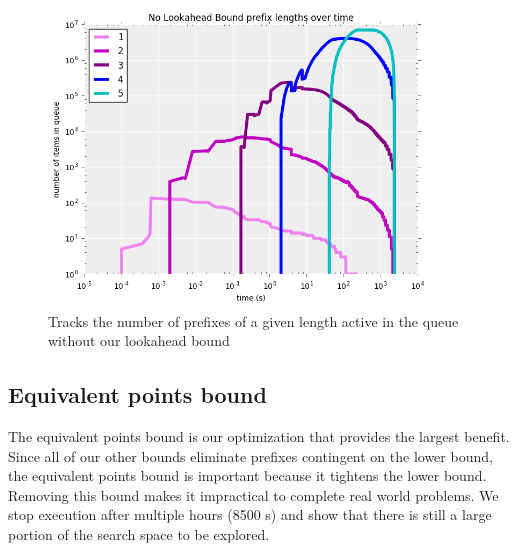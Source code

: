 \begin{figure}[t!]
\begin{center}
\includegraphics[width=0.9\textwidth]{figs/lookahead_prefixes.png}
\end{center}
\caption{Tracks the number of prefixes of a given length active in the queue without our lookahead bound}
\label{fig:lookahead-prefixes}
\end{figure}

\subsection{Equivalent points bound}

The equivalent points bound is our optimization that provides the largest benefit.
Since all of our other bounds eliminate prefixes contingent on the lower bound, the equivalent points bound is important because it tightens the lower bound.
Removing this bound makes it impractical to complete real world problems.
We stop execution after multiple hours (8500 s) and show that there is still a large portion of the search space to be explored.

